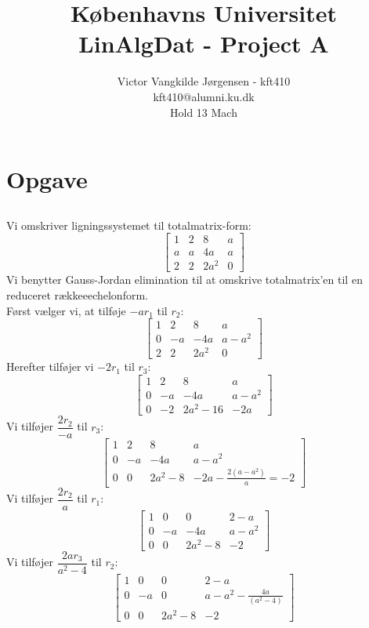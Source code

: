 \documentclass[a4paper,12pt]{article}
\title{Københavns Universitet\\
LinAlgDat - Project A}
\author{Victor Vangkilde Jørgensen - kft410\\ 
kft410@alumni.ku.dk\\
Hold 13 Mach}
\begin{document}
 

\maketitle 

\section[Opgave]{Opgave}
\subsection{}
Vi omskriver ligningssystemet til totalmatrix-form:
\[
\left[\begin{array}{ccc|c}
    1 & 2 & 8 & a \\
    a & a & 4a & a \\
    2 & 2 & 2a^2 & 0
\end{array}\right]
\]
Vi benytter Gauss-Jordan elimination til at omskrive totalmatrix'en til en reduceret rækkeeechelonform.\\
Først vælger vi, at tilføje $-ar_1$ til $r_2$: 
\[
\left[\begin{array}{ccc|c}
    1 & 2 & 8 & a \\
    0 & -a & -4a & a-a^2 \\
    2 & 2 & 2a^2 & 0
\end{array}\right]
\]
Herefter tilføjer vi $-2r_1$ til $r_3$:
\[
\left[\begin{array}{ccc|c}
    1 & 2 & 8 & a \\
    0 & -a & -4a & a-a^2 \\
    0 & -2 & 2a^2-16 & -2a
\end{array}\right]
\]
Vi tilføjer $\dfrac{2r_2}{-a}$ til $r_3$:
\[
\left[\begin{array}{ccc|c}
    1 & 2 & 8 & a \\
    0 & -a & -4a & a-a^2 \\
    0 & 0 & 2a^2-8 & -2a-\frac{2(a-a^2)}{a} = -2
\end{array}\right]
\]
Vi tilføjer $\dfrac{2r_2}{a}$ til $r_1$:
\[
\left[\begin{array}{ccc|c}
    1 & 0 & 0 & 2-a \\
    0 & -a & -4a & a-a^2 \\
    0 & 0 & 2a^2-8 & -2
\end{array}\right]
\]
Vi tilføjer $\dfrac{2ar_3}{a^2-4}$ til $r_2$:
\[
\left[\begin{array}{ccc|c}
    1 & 0 & 0 & 2-a \\
    0 & -a & 0 & a - a^2 -\frac{4a}{(a^2 - 4)} \\
    0 & 0 & 2a^2-8 & -2
\end{array}\right]
\]
\end{document}
